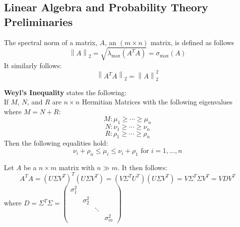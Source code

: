 \documentclass{article} %
\newcommand{\norm}[1]{\left\lVert#1\right\rVert}
\begin{document}
	\begin{appendices}
		
	\newpage
	\appendix
	\startcontents[sections]
	\newpage
	
	\section{Linear Algebra and Probability Theory Preliminaries}
	
	\begin{fact} The spectral norm of a matrix, $A$, an $(m \times n)$ matrix, is defined as follows
		\begin{equation}
			\norm{A}_2 = \sqrt{\lambda_{\max}\left(A^T A\right)} = \sigma_{\max}(A)
		\end{equation}
		It similarly follows:
		\begin{equation}
			\norm{A^T A}_2 = \norm{A}^2_2
		\end{equation}
	\end{fact}

	\begin{fact}
		\textbf{Weyl's Inequality} states the following:\\ If $M$, $N$, and $R$ are $n \times n$ Hermitian Matrices with the following eigenvalues where $M = N + R$:
		\begin{equation*}
			M: \mu_1 \geq \cdots \geq \mu_n
		\end{equation*}
		\begin{equation*}
			N: \nu_1 \geq \cdots \geq \nu_n
		\end{equation*}
		\begin{equation*}
			R: \rho_1 \geq \cdots \geq \rho_n
		\end{equation*}
		Then the following equalities hold:
		\begin{equation*}
			\nu_i + \rho_n \leq \mu_i \leq \nu_i + \rho_1 \text { for } i = 1,\dots,n
		\end{equation*}
	\end{fact}

	\begin{fact}
		Let $A$ be a $n \times m$ matrix with $n \gg m$. It then follows:
		\begin{equation}
			A^T A = \left(U \Sigma V^T\right)^T \left(U \Sigma V^T \right) = \left(V\Sigma^T U^T\right)\left(U \Sigma V^T\right) = V \Sigma^T \Sigma V^T = V D V^T
		\end{equation}
		where $D = \Sigma^T \Sigma = \begin{pmatrix} \sigma_1^2 & & & \\ & \sigma_2^2 & & \\ & & \ddots & \\ & & & \sigma_m^2 \end{pmatrix}$
	\end{fact}


\end{appendices}
\end{document}
